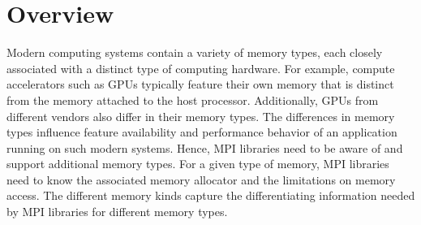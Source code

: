 
\renewcommand{\Color}[1]{}

\newenvironment{etabular}
  {\edtable{tabular}}
  {\endedtable}

\newcommand{\semanticstwo}[2]
{
\Color{green}
\begin{etabular}{l|l}
\hspace*{0.1cm} & #1 \\
& #2\\
\end{etabular}
\vspace*{0.2cm}
\Color{black}
}

\newcommand{\semanticsthree}[3]
{
\Color{green}
\begin{etabular}{l|l}
\hspace*{0.1cm} & #1 \\
& #2\\
& #3\\
\end{etabular}
\vspace*{0.2cm}
\Color{black}
}

\newcommand{\semanticsfour}[4]
{
\Color{green}
\begin{etabular}{l|l}
\hspace*{0.1cm} & #1 \\
& #2\\
& #3\\
& #4\\
\end{etabular}
\vspace*{0.2cm}
\Color{black}
}

\chapter{Overview}

Modern computing systems contain a variety of memory types, each
closely associated with a distinct type of computing hardware. For
example, compute accelerators such as GPUs typically feature their
own memory that is distinct from the memory attached to the host
processor. Additionally, GPUs from different vendors also differ
in their memory types. The differences in memory types influence
feature availability and performance behavior of an application
running on such modern systems. Hence, MPI libraries need to be
aware of and support additional memory types. For a given type of
memory, MPI libraries need to know the associated memory allocator and
the limitations on memory access. The different memory kinds capture
the differentiating information needed by MPI libraries for different
memory types.

